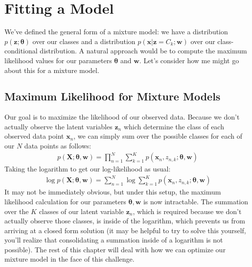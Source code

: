 \section{Fitting a Model}
We've defined the general form of a mixture model: we have a distribution $p(\textbf{z}; \boldsymbol{\theta})$ over our classes and a distribution $p(\textbf{x}|\textbf{z} = C_k; \textbf{w})$ over our class-conditional distribution. A natural approach would be to compute the maximum likelihood values for our parameters $\boldsymbol{\theta}$ and $\textbf{w}$. Let's consider how me might go about this for a mixture model.

\subsection{Maximum Likelihood for Mixture Models}
Our goal is to maximize the likelihood of our observed data. Because we don't actually observe the latent variables $\textbf{z}_n$ which determine the class of each observed data point $\textbf{x}_n$, we can simply sum over the possible classes for each of our $N$ data points as follows:
\begin{align*}
    p(\textbf{X}; \boldsymbol{\theta}, \textbf{w}) = \prod_{n=1}^{N} \sum_{k=1}^{K} p(\textbf{x}_{n}, z_{n, k}; \boldsymbol{\theta}, \textbf{w})
\end{align*}
Taking the logarithm to get our log-likelihood as usual:
\begin{align} \label{intractable-log-likelihood}
    \log p(\textbf{X}; \boldsymbol{\theta}, \textbf{w}) = \sum_{n=1}^{N} \log \sum_{k=1}^{K} p(\textbf{x}_{n}, z_{n, k}; \boldsymbol{\theta}, \textbf{w})
\end{align}
It may not be immediately obvious, but under this setup, the maximum likelihood calculation for our parameters $\boldsymbol{\theta}, \textbf{w}$ is now intractable. The summation over the $K$ classes of our latent variable $\textbf{z}_{n}$, which is required because we don't actually observe those classes, is inside of the logarithm, which prevents us from arriving at a closed form solution (it may be helpful to try to solve this yourself, you'll realize that consolidating a summation inside of a logarithm is not possible). The rest of this chapter will deal with how we can optimize our mixture model in the face of this challenge.


